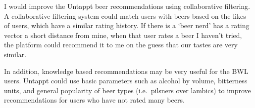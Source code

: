 \documentclass[journal=jacsat,manuscript=article]{achemso}
\begin{document}
I would improve the Untappt beer recommendations using collaborative
filtering. A collaborative filtering system could match users with beers
based on the likes of users, which have a similar rating history. If
there is a `beer nerd' has a rating vector a short distance from mine,
when that user rates a beer I haven't tried, the platform could
recommend it to me on the guess that our tastes are very similar.

In addition, knowledge based recommendations may be very useful for the
BWL users. Untappt could use basic parameters such as alcohol by volume,
bitterness units, and general popularity of beer types (i.e.~pilsners
over lambics) to improve recommendations for users who have not rated
many beers.

\hypertarget{refs}{}
\end{document}
